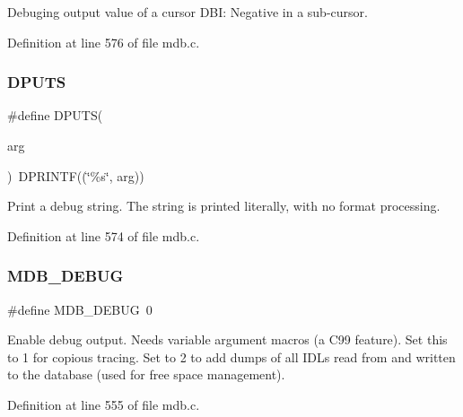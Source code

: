 Debuging output value of a cursor D\+BI\+: Negative in a sub-\/cursor. 

Definition at line 576 of file mdb.\+c.

\mbox{\label{group__debug_ga326823abd056b96347c5925b8b2a055b}} 
\subsubsection{\texorpdfstring{D\+P\+U\+TS}{DPUTS}}
{\footnotesize\ttfamily \#define D\+P\+U\+TS(\begin{DoxyParamCaption}\item[{}]{arg }\end{DoxyParamCaption})~D\+P\+R\+I\+N\+TF((\char`\"{}\%s\char`\"{}, arg))}

Print a debug string. The string is printed literally, with no format processing. 

Definition at line 574 of file mdb.\+c.

\mbox{\label{group__debug_gacc640cdb0a161db62cc7fd09642aa79e}} 
\subsubsection{\texorpdfstring{M\+D\+B\+\_\+\+D\+E\+B\+UG}{MDB\_DEBUG}}
{\footnotesize\ttfamily \#define M\+D\+B\+\_\+\+D\+E\+B\+UG~0}

Enable debug output. Needs variable argument macros (a C99 feature). Set this to 1 for copious tracing. Set to 2 to add dumps of all I\+D\+Ls read from and written to the database (used for free space management). 

Definition at line 555 of file mdb.\+c.

